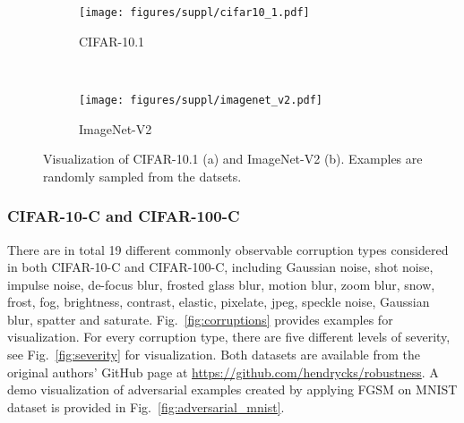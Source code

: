 \documentclass[journal]{IEEEtran}
\theoremstyle{definition}
\theoremstyle{remark}
\begin{document}
\begin{figure}[!htbp]
	\centering
	\begin{subfigure}[t]{.48\textwidth}
		\centering
		\texttt{[image: figures/suppl/cifar10\_1.pdf]}
		\caption{CIFAR-10.1\label{fig:cifar10_1}}
	\end{subfigure}\\ \vspace{3mm}
	\begin{subfigure}[t]{.48\textwidth}
		\centering
		\texttt{[image: figures/suppl/imagenet\_v2.pdf]}
		\caption{ImageNet-V2\label{fig:imagenetv2}}
	\end{subfigure}
	\caption{Visualization of CIFAR-10.1 (a) and ImageNet-V2 (b). Examples are randomly sampled from the datsets.
	\label{fig:new_test_set}}
\end{figure}

\subsubsection{CIFAR-10-C and CIFAR-100-C}
There are in total 19 different commonly observable corruption types considered in both CIFAR-10-C and CIFAR-100-C, including Gaussian noise, shot noise, impulse noise, de-focus blur, frosted glass blur, motion blur, zoom blur, snow, frost, fog, brightness, contrast, elastic, pixelate, jpeg, speckle noise, Gaussian blur, spatter and saturate. Fig.~\ref{fig:corruptions} provides examples for visualization. For every corruption type, there are five different levels of severity, see Fig.~\ref{fig:severity} for visualization. Both datasets are available from the original authors' GitHub page at {\color{red} \url{https://github.com/hendrycks/robustness}}. A demo visualization of adversarial examples created by applying FGSM \cite{goodfellow2014explaining} on MNIST dataset is provided in Fig.~\ref{fig:adversarial_mnist}.
\end{document}
